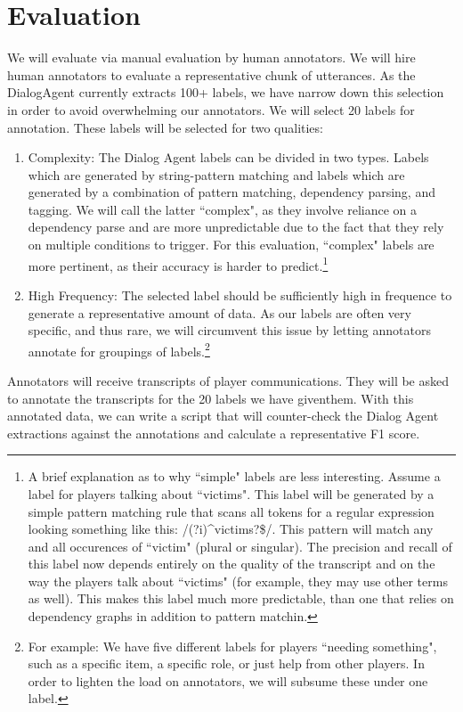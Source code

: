 \section{Evaluation}
We will evaluate via manual evaluation by human annotators. We will hire human annotators to evaluate a representative chunk of utterances. As the DialogAgent currently extracts 100+ labels, we have narrow down this selection in order to avoid overwhelming our annotators. 
We will select 20 labels for annotation. These labels will be selected for two qualities:
\begin{enumerate}
\item Complexity: The Dialog Agent labels can be divided in two types. Labels which are generated by string-pattern matching and labels which are generated by a combination of pattern matching, dependency parsing, and tagging. We will call the latter ``complex", as they involve reliance on a dependency parse and are more unpredictable due to the fact that they rely on multiple conditions to trigger. For this evaluation, ``complex" labels are more pertinent, as their accuracy is harder to predict.\footnote{A brief explanation as to why ``simple" labels are less interesting. Assume a label for players talking about ``victims". This label will be generated by a simple pattern matching rule that scans all tokens for a regular expression looking something like this: /(?i)^victims?\$/. This pattern will match any and all occurences of ``victim" (plural or singular). The precision and recall of this label now depends entirely on the quality of the transcript and on the way the players talk about ``victims" (for example, they may use other terms as well). This makes this label much more predictable, than one that relies on dependency graphs in addition to pattern matchin.}
\item High Frequency: The selected label should be sufficiently high in frequence to generate a representative amount of data. As our labels are often very specific, and thus rare, we will circumvent this issue by letting annotators annotate for groupings of labels.\footnote{For example: We have five different labels for players ``needing something", such as a specific item, a specific role, or just help from other players. In order to lighten the load on annotators, we will subsume these under one label.}
\end{enumerate}

Annotators will receive transcripts of player communications. They will be asked to annotate the transcripts for the 20 labels we have giventhem. With this annotated data, we can write a script that will counter-check the Dialog Agent extractions against the annotations and calculate a representative F1 score.



